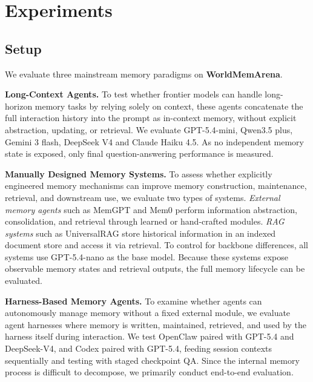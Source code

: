 \documentclass{article}
\begin{document}
% 


\section{Experiments}
\label{sec:exp}

\subsection{Setup}
We evaluate three mainstream memory paradigms on \textbf{WorldMemArena}. 

\textbf{Long-Context Agents.} To test whether frontier models can handle long-horizon memory tasks by relying solely on context, these agents concatenate the full interaction history into the prompt as in-context memory, without explicit abstraction, updating, or retrieval. We evaluate GPT-5.4-mini, Qwen3.5 plus, Gemini 3 flash, DeepSeek V4 and Claude Haiku 4.5. As no independent memory state is exposed, only final question-answering performance is measured.

\textbf{Manually  Designed Memory Systems.} To assess whether explicitly engineered memory mechanisms can improve memory construction, maintenance, retrieval, and downstream use, we evaluate two types of systems. \textit{External memory agents} such as MemGPT and Mem0 perform information abstraction, consolidation, and retrieval through learned or hand-crafted modules. \textit{RAG systems} such as UniversalRAG  store historical information in an indexed document store and access it via retrieval. To control for backbone differences, all systems use GPT-5.4-nano as the base model. Because these systems expose observable memory states and retrieval outputs, the full memory lifecycle can be evaluated.

\textbf{Harness-Based Memory Agents.} To examine whether agents can autonomously manage memory without a fixed external module, we evaluate agent harnesses where memory is written, maintained, retrieved, and used by the harness itself during interaction. We test OpenClaw paired with GPT-5.4 and DeepSeek-V4, and Codex paired with GPT-5.4, feeding session contexts sequentially and testing with staged checkpoint QA. Since the internal memory process is difficult to decompose, we primarily conduct end-to-end evaluation.


\end{document}
